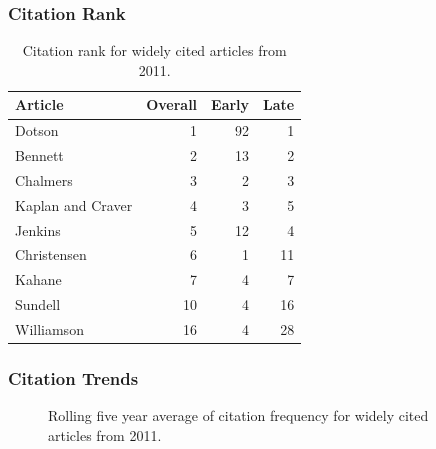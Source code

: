 \documentclass[
  10pt,
  letterpaper,
  DIV=11,
  numbers=noendperiod,
  twoside]{scrartcl}
\begin{document}
\subsubsection*{Citation Rank}\label{sec-rank-2011}

\begin{longtable}[]{@{}lrrr@{}}

\caption{\label{tbl-citation-rank-2011}Citation rank for widely cited
articles from 2011.}

\tabularnewline

\toprule\noalign{}
Article & Overall & Early & Late \\
\midrule\noalign{}
\endhead
\bottomrule\noalign{}
\endlastfoot
Dotson & 1 & 92 & 1 \\
Bennett & 2 & 13 & 2 \\
Chalmers & 3 & 2 & 3 \\
Kaplan and Craver & 4 & 3 & 5 \\
Jenkins & 5 & 12 & 4 \\
Christensen & 6 & 1 & 11 \\
Kahane & 7 & 4 & 7 \\
Sundell & 10 & 4 & 16 \\
Williamson & 16 & 4 & 28 \\

\end{longtable}

\subsubsection*{Citation Trends}\label{sec-trends-2011}

\begin{figure}


\caption{\label{fig-citation-spaghetti-2011}Rolling five year average of
citation frequency for widely cited articles from 2011.}

\end{figure}%
\end{document}
